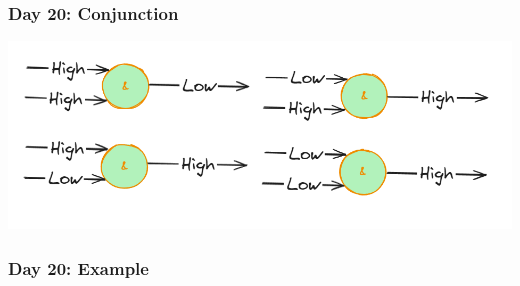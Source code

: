 \begin{frame}
\frametitle{Day 20: Conjunction}

\includegraphics[width=\textwidth]{Day20Conjunction}

\end{frame}

\begin{frame}[fragile]
\frametitle{Day 20: Example}


\end{frame}
